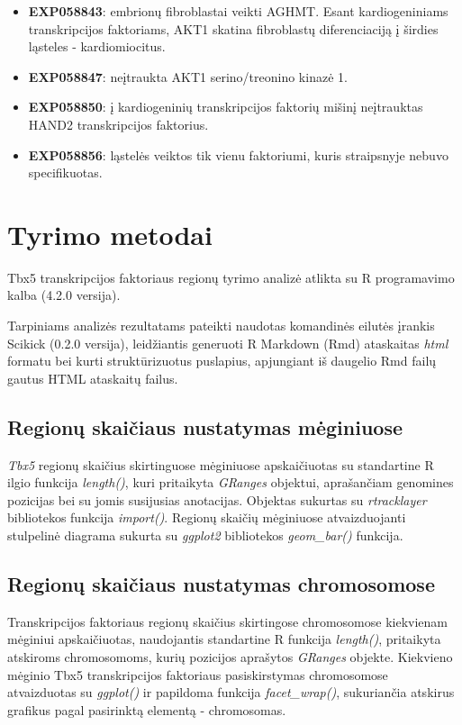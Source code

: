 \documentclass[12pt]{article}
\begin{document}
\begin{itemize}
    \item \textbf{EXP058843}: embrionų fibroblastai veikti AGHMT. Esant
        kardiogeniniams transkripcijos faktoriams, AKT1 skatina fibroblastų
        diferenciaciją į širdies ląsteles - kardiomiocitus.
    \item \textbf{EXP058847}: neįtraukta AKT1 serino/treonino kinazė 1.
    \item \textbf{EXP058850}: į kardiogeninių transkripcijos faktorių mišinį
        neįtrauktas HAND2 transkripcijos faktorius.
    \item \textbf{EXP058856}: ląstelės veiktos tik vienu faktoriumi, kuris
        straipsnyje nebuvo specifikuotas.
  \end{itemize}
\newpage


\section{Tyrimo metodai}
Tbx5 transkripcijos faktoriaus regionų tyrimo analizė atlikta
su R programavimo kalba\cite{R} (4.2.0 versija).

Tarpiniams analizės rezultatams pateikti naudotas komandinės eilutės
įrankis Scikick\cite{SCIK} (0.2.0 versija), leidžiantis generuoti
R Markdown (Rmd) ataskaitas \emph{html} formatu bei kurti
struktūrizuotus puslapius, apjungiant iš daugelio Rmd failų
gautus HTML ataskaitų failus.

\subsection{Regionų skaičiaus nustatymas mėginiuose}
\emph{Tbx5} regionų skaičius skirtinguose mėginiuose apskaičiuotas
su standartine R ilgio funkcija \emph{length()}, kuri pritaikyta
\emph{GRanges} objektui, aprašančiam genomines pozicijas bei su jomis
susijusias anotacijas. Objektas sukurtas su \emph{rtracklayer}\cite{R_TRACK}
bibliotekos funkcija \emph{import()}.
Regionų skaičių mėginiuose atvaizduojanti stulpelinė diagrama
sukurta su \emph{ggplot2}\cite{R_GGPLOT} bibliotekos
\emph{geom\_bar()} funkcija.

\subsection{Regionų skaičiaus nustatymas chromosomose}
Transkripcijos faktoriaus regionų skaičius skirtingose chromosomose
kiekvienam mėginiui apskaičiuotas, naudojantis standartine R
funkcija \emph{length()}, pritaikyta atskiroms chromosomoms,
kurių pozicijos aprašytos \emph{GRanges} objekte.
Kiekvieno mėginio Tbx5 transkripcijos faktoriaus pasiskirstymas
chromosomose atvaizduotas su \emph{ggplot()} ir papildoma funkcija
\emph{facet\_wrap()}, sukuriančia atskirus grafikus pagal pasirinktą
elementą - chromosomas.
\end{document}

